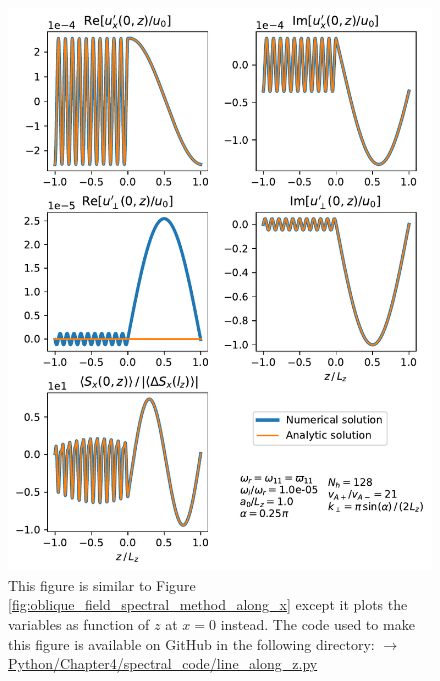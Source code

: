 \begin{figure}
    \centering
    \vspace{-20pt}
    \includegraphics[width=\textwidth,height=0.9\textheight,keepaspectratio]{figures/chapter04/oblique_field_spectral_method_along_z.pdf}
    \vspace{-10pt}
    \caption{This figure is similar to Figure \ref{fig:oblique_field_spectral_method_along_x} except it plots the variables as function of $z$ at $x=0$ instead. The code used to make this figure is available on GitHub in the following directory:\newline
    \href{https://github.com/aleksyprok/apkp_thesis/blob/main/Python/Chapter4/spectral_code/line_along_z.py}{$\rightarrow$ Python/Chapter4/spectral\_code/line\_along\_z.py}}
    \label{fig:oblique_field_spectral_method_along_z}
    \vspace{-20pt}
\end{figure}

